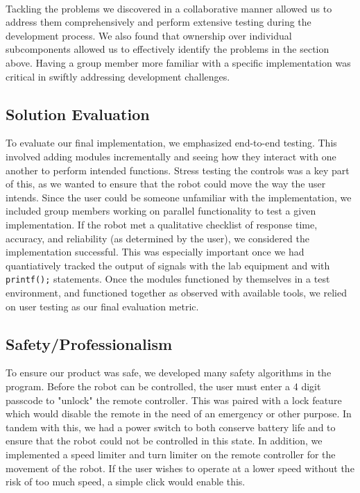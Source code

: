 \documentclass{article}
\begin{document}
\


Tackling the problems we discovered in a collaborative manner allowed us to address them comprehensively and perform extensive testing during the
development process. We also found that ownership over individual subcomponents allowed us to effectively identify the problems in the section above. Having a group member
more familiar with a specific implementation was critical in swiftly addressing development challenges.


\subsection{Solution Evaluation}

To evaluate our final implementation, we emphasized end-to-end testing. This involved adding modules incrementally and seeing how they interact with one another to
perform intended functions. Stress testing the controls was a key part of this, as we wanted to ensure that the robot could move the way the user intends. Since the user
could be someone unfamiliar with the implementation, we included group members working on parallel functionality to test a given implementation. If the robot met a qualitative checklist
of response time, accuracy, and reliability (as determined by the user), we considered the implementation successful. This was especially important once we had quantiatively tracked the
output of signals with the lab equipment and with \texttt{printf();} statements. Once the modules functioned by themselves in a test environment, and functioned together as observed with
available tools, we relied on user testing as our final evaluation metric.


\subsection{Safety/Professionalism}

To ensure our product was safe, we developed many safety algorithms in the program. Before the robot can be controlled, the user must enter a 4 digit passcode
to "unlock" the remote controller. This was paired with a lock feature which would disable the remote in the need of an emergency or other purpose. In tandem with this,
we had a power switch to both conserve battery life and to ensure that the robot could not be controlled in this state. In addition, we implemented a speed limiter and turn
limiter on the remote controller for the movement of the robot. If the user wishes to operate at a lower speed without the risk of too much speed, a simple click would enable this.
\end{document}
